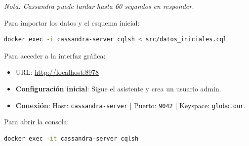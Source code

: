 \documentclass[12pt,a4paper]{article}
\begin{document}
\emph{Nota: Cassandra puede tardar hasta 60 segundos en responder.}

Para importar los datos y el esquema inicial:

\begin{lstlisting}[language=bash]
docker exec -i cassandra-server cqlsh < src/datos_iniciales.cql
\end{lstlisting}

Para acceder a la interfaz gráfica:
\begin{itemize}
    \item URL: \url{http://localhost:8978}
    \item \textbf{Configuración inicial}: Sigue el asistente y crea un usuario admin.
    \item \textbf{Conexión}: Host: \texttt{cassandra-server} | Puerto: \texttt{9042} | Keyspace: \texttt{globotour}.
\end{itemize}


Para abrir la consola:

\begin{lstlisting}[language=bash]
docker exec -it cassandra-server cqlsh
\end{lstlisting}
\end{document}
